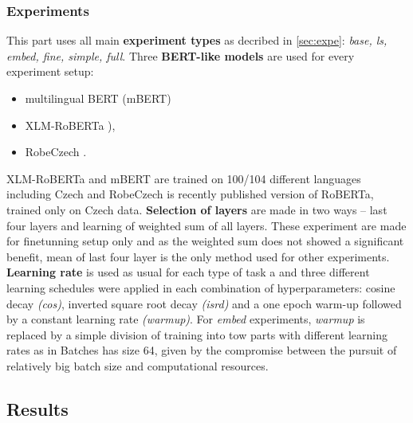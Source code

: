 \subsubsection{Experiments}
This part uses all main \textbf{experiment types} as decribed in \ref{sec:expe}: \textit{base, ls, embed, fine, simple, full}. Three \textbf{BERT-like models} are used for every experiment setup:
\begin{itemize}
\item multilingual BERT (mBERT) \citep{Devlin2019} 
\item XLM-RoBERTa \citep{Conneau2019}), 
\item RobeCzech \citep{Straka2021}.
\end{itemize}
XLM-RoBERTa and mBERT are trained on 100/104 different languages including Czech and RobeCzech is recently published version of RoBERTa, trained only on Czech data. %
\textbf{Selection of layers} are made in two ways -- last four layers and learning of weighted sum of all layers. These experiment are made for finetunning setup only and as the weighted sum does not showed a significant benefit, mean of last four layer is the only method used for other experiments. %
 \textbf{Learning rate} is used as usual for each type of task a and three different learning schedules were applied in each combination of hyperparameters: cosine decay \textit{(cos)}, inverted square root decay \textit{(isrd)} and a one epoch warm-up followed by a constant learning rate \textit{(warmup)}. For \textit{embed} experiments, \textit{warmup} is replaced by  a simple division of training into tow parts with different learning rates as in %
Batches has size 64, given by the compromise between the pursuit of relatively big batch size and computational resources. %

\subsection{Results}


